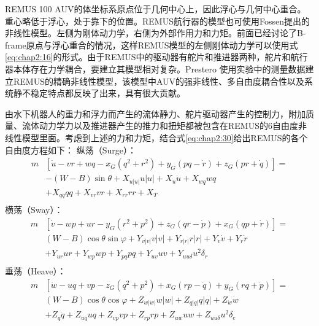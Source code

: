 REMUS 100 AUV的体坐标系原点位于几何中心上，因此浮心与几何中心重合。重心略低于浮心，处于靠下的位置。REMUS航行器的模型也可使用Fossen提出的非线性模型。左侧为刚体动力学，右侧为外部作用力和力矩。前面已经讨论了B-frame原点与浮心重合的情况，这样REMUS模型的左侧刚体动力学可以使用式\ref{eq:chap2:16}的形式。由于REMUS中的驱动器有舵片和推进器两种，舵片和航行器本体存在力学耦合，要建立其模型相对复杂。Prestero\cite{prestero2001verification} 使用实验中的测量数据建立REMUS的精确非线性模型，该模型中AUV的强非线性、多自由度耦合性以及系统静不稳定特点都反映了出来，具有很大贡献。

由水下机器人的重力和浮力而产生的流体静力、舵片驱动器产生的控制力，附加质量、流体动力学力以及推进器产生的推力和扭矩都被包含在REMUS的6自由度非线性模型里面。考虑到上述的力和力矩，结合式\ref{eq:chap2:30}给出REMUS的各个自由度方程如下：
纵荡（Surge）：
\begin{equation}
\label{eq:chap2:surgeremus}
\begin{aligned}
m &\left[ \dot u - vr  + wq - {x_G}({q^2} + {r^2}) + {y_G}(pq - \dot r) + {z_G}(pr + \dot q) \right] =  \\
&- (W - B)\sin \theta  + {X_{u\left| u \right|}}u\left| u \right| + {X_{\dot u}}\dot u + {X_{wq}}wq\\
&+ {X_{qq}}qq + {X_{vr}}vr + {X_{rr}}rr + {X_T}  \\
\end{aligned}
\end{equation}
横荡（Sway）：
\begin{equation}
\label{eq:chap2:swayremus}
\begin{aligned}
 m&\left[ {\dot v - wp + ur - {y_G}({r^2} + {p^2}) + {z_G}(qr - \dot p) + {x_G}(qp + \dot r)} \right] =\\
 & (W - B)\cos \theta \sin \varphi  + {Y_{v\left| v \right|}}v\left| v \right| + {Y_{r\left| r \right|}}r\left| r \right| + {Y_{\dot v}}\dot v + {Y_{\dot r}}\dot r \\
 &+ {Y_{ur}}ur + {Y_{wp}}wp + {Y_{pq}}pq +  {Y_{uv}}uv + {Y_{uu\delta }}{u^2}{\delta _r}  \\
\end{aligned}
\end{equation}
垂荡（Heave）：
\begin{equation}
\label{eq:chap2:heaveremus}
\begin{aligned}
 m&\left[ {\dot w - uq + vp - {z_G}({q^2} + {p^2}) + {x_G}(rp - \dot q) + {y_G}(rq + \dot p)} \right] =\\
 & (W - B)\cos \theta \cos \varphi  + {Z_{w\left| w \right|}}w\left| w \right| + {Z_{q\left| q \right|}}q\left| q \right| + {Z_{\dot w}}\dot w \\
 &+ {Z_{\dot q}}\dot q + {Z_{uq}}uq + {Z_{vp}}vp + {Z_{rp}}rp + {Z_{uw}}uw + {Z_{uu\delta }}{u^2}{\delta _e}  \\
\end{aligned}
\end{equation}
